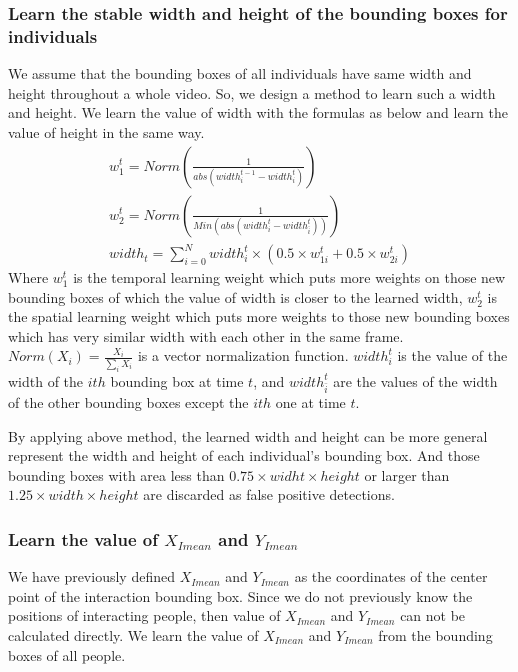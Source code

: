 \subsubsection*{Learn the stable width and height of the bounding boxes for individuals}
We assume that the bounding boxes of all individuals have same width and height throughout a whole video. So, we design a method to learn such a width and height. We learn the value of width with the formulas as below and learn the value of height in the same way. 
\begin{eqnarray}
	w_1^t = Norm\left(\frac{1}{abs(width_i^{t-1} - width_i^t)}\right) \\
	w_2^t = Norm\left(\frac{1}{Min(abs(width_i^t - width_{\bar i}^t))}    \right) \\
	width_t = \sum_{i=0}^N width_i^t \times (0.5 \times w_{1i}^t + 0.5 \times w_{2i}^t)
\end{eqnarray}
Where \(w_{1}^t\) is the temporal learning weight which puts more weights on those new bounding boxes of which the value of width is closer to the learned width, \(w_{2}^t\) is the spatial learning weight which puts more weights to those new bounding boxes which has very similar width with each other in the same frame. \(Norm(X_i) = \frac{X_i}{\sum_i X_i} \) is a vector normalization function. \(width_i^t\) is the value of the width of the \(ith\) bounding box at time \(t\), and \(width_{\bar i}^t\) are the values of the width of the other bounding boxes except the \(ith\) one at time \(t\).  
\par 
By applying above method, the learned width and height can be more general represent the width and height of each individual's bounding box. And those bounding boxes with area less than \(0.75\times widht \times height \) or larger than \(1.25 \times width \times height\) are discarded as false positive detections. 

\subsubsection*{Learn the value of \(X_{Imean}\) and \(Y_{Imean}\)}
We have previously defined \(X_{Imean}\) and \(Y_{Imean}\) as the coordinates of the center point of the interaction bounding box. 	Since we do not previously know the positions of interacting people, then value of  \(X_{Imean}\) and \(Y_{Imean}\) can not be calculated directly. We learn the value of  \(X_{Imean}\) and \(Y_{Imean}\) from the bounding boxes of all people. 
